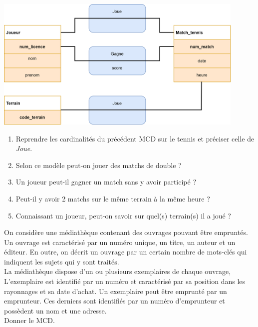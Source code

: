 \begin{exercice}[]
    \begin{center}
        \includegraphics[width=12cm]{img/ex3}
    \end{center}
    \begin{enumerate}
        \item 	Reprendre les cardinalités du précédent MCD sur le tennis et préciser celle de \textit{Joue}.
        \item 	Selon ce modèle peut-on jouer des matchs de double ?
        \item 	Un joueur peut-il gagner un match sans y avoir participé ?
        \item 	Peut-il y avoir 2 matchs sur le même terrain à la même heure ?
        \item 	Connaissant un joueur, peut-on savoir sur quel(s) terrain(s) il a joué ?
    \end{enumerate}
\end{exercice}

\begin{exercice}[]
    On considère une médiathèque contenant des ouvrages pouvant être empruntés.\\
    Un ouvrage est caractérisé par un numéro unique, un titre, un auteur et un éditeur. En outre, on décrit un ouvrage par un certain nombre de mots-clés qui indiquent les sujets qui y sont traités.\\
    La médiathèque dispose d'un ou plusieurs exemplaires de chaque ouvrage, L'exemplaire est identifié par un numéro et caractérisé par sa position dans les rayonnages et sa date d'achat.
    Un exemplaire peut être emprunté par un emprunteur. Ces derniers sont identifiés par un numéro d'emprunteur et possèdent un nom et une adresse.\\
    
    Donner le MCD.
\end{exercice}
